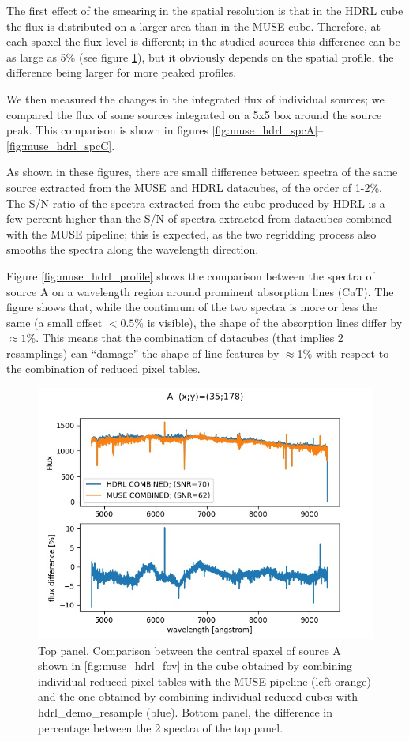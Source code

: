 The first effect of the smearing in the spatial resolution is that in
the HDRL cube the flux is distributed on a larger area than in the
MUSE cube. Therefore, at each spaxel the flux level is different; in
the studied sources this difference can be as large as 5\% (see figure
\ref{fig:muse_hdrl_spaxel}), but it obviously depends on the spatial
profile, the difference being larger for more peaked profiles.

We then measured the changes in the integrated flux of individual
sources; we compared the flux of some sources integrated on a 5x5 box
around the source peak.  This comparison is shown in figures
\ref{fig:muse_hdrl_spcA}--\ref{fig:muse_hdrl_spcC}.

As shown in these figures, there are small difference between spectra
of the same source extracted from the MUSE and HDRL datacubes, of the
order of 1-2\%. The S/N ratio of the spectra extracted from the cube
produced by HDRL is a few percent higher than the S/N of spectra
extracted from datacubes combined with the MUSE pipeline; this is
expected, as the two regridding process also smooths the spectra along
the wavelength direction.

Figure \ref{fig:muse_hdrl_profile} shows the comparison between the
spectra of source A on a wavelength region around prominent absorption
lines (CaT). The figure shows that, while the continuum of the two
spectra is more or less the same (a small offset $<0.5$\% is visible),
the shape of the absorption lines differ by $\approx 1$\%. This means
that the combination of datacubes (that implies 2 resamplings) can
``damage'' the shape of line features by $\approx $1\% with respect to
the combination of reduced pixel tables.




\begin{figure}[H]
\centering
\includegraphics[width=12cm]{figures/spc_A_single_spaxel.jpg}
\caption[] {\footnotesize Top panel. Comparison between the central spaxel
  of source A shown in \ref{fig:muse_hdrl_fov} in the cube obtained by
  combining individual reduced pixel tables with the MUSE pipeline
  (left orange) and the one obtained by combining individual reduced
  cubes with hdrl\_demo\_resample (blue). Bottom panel, the difference
  in percentage between the 2 spectra of the top panel. }
	\label{fig:muse_hdrl_spaxel}
\end{figure}


